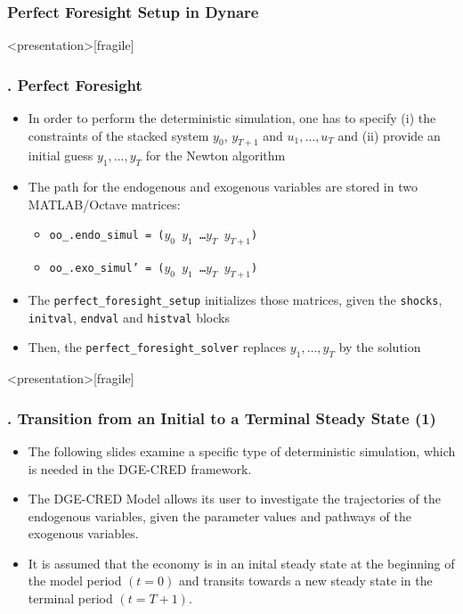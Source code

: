 \documentclass[11pt,aspectratio=169]{beamer}
\begin{document}
\subsubsection{Perfect Foresight Setup in Dynare}
\begin{frame}<presentation>[fragile]
	\frametitle{{\thesection.\thesubsection\thinspace\thesubsubsection} Perfect Foresight}
	\begin{itemize}
		\item In order to perform the deterministic simulation, one has to specify (i) the constraints of the stacked system $y_0$, $y_{T+1}$ and $u_1, \ldots , u_T$ and (ii) provide an initial guess $y_1, \ldots , y_T$ for the Newton algorithm 
		\item The path for the endogenous and exogenous variables are stored in two MATLAB/Octave matrices:
		\begin{itemize}
			\item \texttt{oo\_.endo\_simul = ($y_0$  $y_1$ \ldots \enspace  $y_T$  $y_{T+1}$)}
			\item \texttt{oo\_.exo\_simul' = ($y_0$  $y_1$ \ldots \enspace  $y_T$  $y_{T+1}$)}
		\end{itemize}
		\item The \texttt{perfect\_foresight\_setup} initializes those matrices, given the \texttt{shocks}, \texttt{initval}, \texttt{endval} and \texttt{histval} blocks
		\item Then, the \texttt{perfect\_foresight\_solver} replaces $y_1,\ldots,y_T$ by the solution 
	\end{itemize}
\end{frame}
\begin{frame}<presentation>[fragile]
	\frametitle{{\thesection.\thesubsection\thinspace\thesubsubsection} Transition from an Initial to a Terminal Steady State (1)}
	\begin{itemize}
		\item The following slides examine a specific type of deterministic simulation, which is needed in the DGE-CRED framework. 
		\item The DGE-CRED Model allows its user to investigate the trajectories of the endogenous variables, given the parameter values and pathways of the exogenous variables.
		\item It is assumed that the economy is in an inital steady state at the beginning of the model period $(t=0)$ and transits towards a new steady state in the terminal period $(t=T+1)$.
	\end{itemize}
\end{frame}
\end{document}
